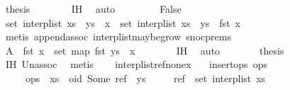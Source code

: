 \begin{isabellebody}
\ {\isacharquery}thesis\isanewline
\ \ \ \ \ \ \isamarkupfalse%
\ IH\ \isamarkupfalse%
\ auto\isanewline
\ \ \isamarkupfalse%
\isanewline
\ \ \ \ \isamarkupfalse%
\ False\isanewline
\ \ \ \ \isamarkupfalse%
\ \isamarkupfalse%
\ {\isachardoublequoteopen}set\ {\isacharparenleft}interp{\isacharunderscore}list\ {\isacharparenleft}xs\ {\isacharat}\ ys\ {\isacharat}\ {\isacharbrackleft}x{\isacharbrackright}{\isacharparenright}{\isacharparenright}\ {\isacharequal}\ set\ {\isacharparenleft}interp{\isacharunderscore}list\ {\isacharparenleft}xs\ {\isacharat}\ ys{\isacharparenright}{\isacharparenright}\ {\isasymunion}\ {\isacharbraceleft}fst\ x{\isacharbraceright}{\isachardoublequoteclose}\isanewline
\ \ \ \ \ \ \isamarkupfalse%
\ {\isacharparenleft}metis\ append{\isacharunderscore}assoc\ interp{\isacharunderscore}list{\isacharunderscore}maybe{\isacharunderscore}grow{}\ snoc{\isachardot}prems{\isacharparenright}\isanewline
\ \ \ \ \isamarkupfalse%
\ \isamarkupfalse%
\ {\isachardoublequoteopen}A\ {\isasymunion}\ {\isacharbraceleft}fst\ x{\isacharbraceright}\ {\isasymsubseteq}\ set\ {\isacharparenleft}map\ fst\ {\isacharparenleft}ys\ {\isacharat}\ {\isacharbrackleft}x{\isacharbrackright}{\isacharparenright}{\isacharparenright}{\isachardoublequoteclose}\isanewline
\ \ \ \ \ \ \isamarkupfalse%
\ IH\ \isamarkupfalse%
\ auto\isanewline
\ \ \ \ \isamarkupfalse%
\ \isamarkupfalse%
\ {\isacharquery}thesis\isanewline
\ \ \ \ \ \ \isamarkupfalse%
\ IH\ Un{\isacharunderscore}assoc\ \isamarkupfalse%
\ metis\isanewline
\ \ \isamarkupfalse%
\isanewline
{}\isamarkupfalse%
%
\endisatagproof
{\isafoldproof}%
%
\isadelimproof
\isanewline
%
\endisadelimproof
\isanewline
{}\isamarkupfalse%
\ interp{\isacharunderscore}list{\isacharunderscore}ref{\isacharunderscore}nonex{\isacharcolon}\isanewline
\ \ \ {\isachardoublequoteopen}insert{\isacharunderscore}ops\ ops{\isachardoublequoteclose}\isanewline
\ \ \ \ \ {\isachardoublequoteopen}ops\ {\isacharequal}\ xs\ {\isacharat}\ {\isacharbrackleft}{\isacharparenleft}oid{\isacharcomma}\ Some\ ref{\isacharparenright}{\isacharbrackright}\ {\isacharat}\ ys{\isachardoublequoteclose}\isanewline
\ \ \ \ \ {\isachardoublequoteopen}ref\ {\isasymnotin}\ set\ {\isacharparenleft}interp{\isacharunderscore}list\ xs{\isacharparenright}{\isachardoublequoteclose}\isanewline

\end{isabellebody}
